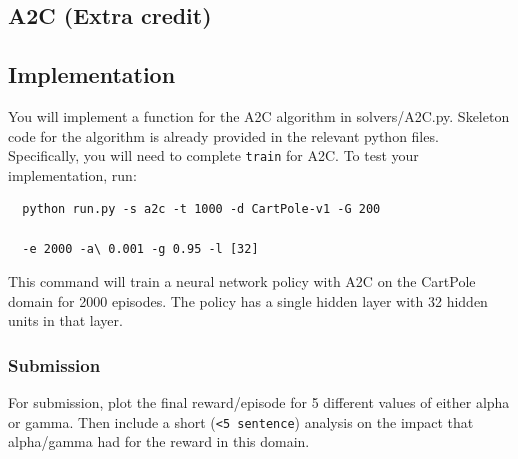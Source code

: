 \documentclass[a4paper]{article}
\theoremstyle{definition}
\begin{document}
\begin{enumerate}
\section{A2C (Extra credit)}
\subsection{Implementation}

You will implement a function for the A2C algorithm in solvers/A2C.py.
% 
Skeleton code for the algorithm is already provided in the relevant python files.
% 
Specifically, you will need to complete \verb|train| for A2C.
% 
To test your implementation, run:
% 
\begin{verbatim}
  python run.py -s a2c -t 1000 -d CartPole-v1 -G 200 
  
  -e 2000 -a\ 0.001 -g 0.95 -l [32]
\end{verbatim}
% 
This command will train a neural network policy with A2C on the CartPole domain for 2000 episodes.
% 
The policy has a single hidden layer with 32 hidden units in that layer.
\subsubsection*{Submission}
% 

For submission, plot the final reward/episode for 5 different values of either alpha or gamma. Then include a short (\verb|<5 sentence|) analysis on the impact that alpha/gamma had for the reward in this domain.



\end{enumerate}
\end{document}
